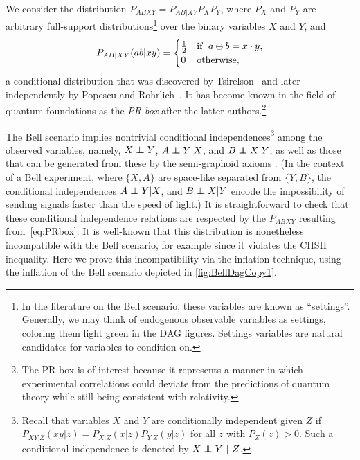We consider the distribution ${P_{A B X Y} = P_{A B | X Y} P_{X} P_{Y}}$, where $P_{X}$ and $P_{Y}$ are arbitrary full-support distributions\footnote{In the literature on the Bell scenario, these variables are known as ``settings''. Generally, we may think of endogenous observable variables as settings, coloring them light green in the DAG figures. Settings variables are natural candidates for variables to condition on.} over the binary variables $X$ and $Y$, and
\begin{align}\begin{split}\label{eq:PRbox}
P_{A B | X Y}\lparen a b |x y\rparen=\begin{cases}\tfrac{1}{2}&\text{if }\; a \oplus b = x \cdot y , \\ 0&\text{otherwise},\end{cases}
\end{split}\end{align}
a conditional distribution that was discovered by Tsirelson~\cite{Tsirelson1980} and later independently by Popescu and Rohrlich~\cite{PROriginal,PRUnit}. It has become known in the field of quantum foundations as the \emph{PR-box} after the latter authors.\footnote{The PR-box is of interest because it represents a manner in which experimental correlations could deviate from the predictions of quantum theory while still being consistent with relativity.}


The Bell scenario implies nontrivial conditional independences\footnote{Recall that variables $X$ and $Y$ are conditionally independent given $Z$ if $P_{XY|Z}(xy|z) = P_{X|Z}(x|z) P_{Y|Z}(y|z)$ for all $z$ with $P_{Z}(z)>0$. Such a conditional independence is denoted by $X\perp\!\!\!\!\perp Y\text{ }|\text{ }Z$.} among the observed variables, namely, $X \perp\!\!\!\!\perp Y$, $A \perp\!\!\!\!\perp Y| X$, and $B \perp\!\!\!\!\perp X|Y$, as well as those that can be generated from these by the semi-graphoid axioms \cite{WoodSpekkens}.
(In the context of a Bell experiment, where $\{X,A\}$ are space-like separated from $\{Y,B\}$, the conditional independences $A \perp\!\!\!\!\perp Y| X$, and $B \perp\!\!\!\!\perp X|Y$ encode the impossibility of sending signals faster than the speed of light.) It is straightforward to check that these conditional independence relations are respected by the $P_{ABXY}$ resulting from~\cref{eq:PRbox}. It is well-known that this distribution is nonetheless incompatible with the Bell scenario, for example since it violates the CHSH inequality.
Here we prove this incompatibility via the inflation technique, using the inflation of the Bell scenario depicted in \cref{fig:BellDagCopy1}.

